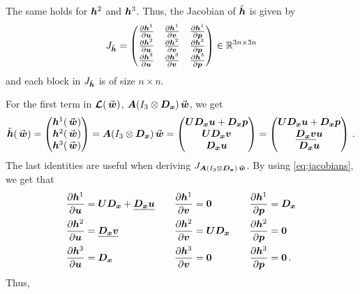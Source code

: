 The same holds for $\bm{h}^2$ and $\bm{h}^3$. Thus, the Jacobian of $\tilde{\bm{h}}$ is given by
\[
  J_{\tilde{\bm{h}}} =
  \begin{pmatrix}
    \frac{\partial \bm{h}^1 }{\partial \bm{u}} &
    \frac{\partial \bm{h}^1 }{\partial \bm{v}} & 
    \frac{\partial \bm{h}^1 }{\partial \bm{p}}
    \\
    \frac{\partial \bm{h}^2 }{\partial \bm{u}} &
    \frac{\partial \bm{h}^2 }{\partial \bm{v}} & 
    \frac{\partial \bm{h}^2 }{\partial \bm{p}}
    \\
    \frac{\partial \bm{h}^3 }{\partial \bm{u}} &
    \frac{\partial \bm{h}^3 }{\partial \bm{v}} & 
    \frac{\partial \bm{h}^3 }{\partial \bm{p}}
  \end{pmatrix}
  \in \mathbb{R}^{3n\times 3n}
\]
and each block in $J_{\tilde{\bm{h}}}$ is of size $n\times n$. 

For the first term in $\euln(\wn)$, $\An (I_3 \otimes \Dx) \wn$, we get 
\[
  \tilde{\hn}(\wn) = 
  \begin{pmatrix}
    \hn^1(\wn) \\ \hn^2(\wn) \\ \hn^3(\wn) 
  \end{pmatrix}
  =
  \An (I_3 \otimes \Dx) \wn = 
  \begin{pmatrix}
    \Un \Dx \un  + \Dx \pn
    \\
    \Un \Dx \vn
    \\
    \Dx \un
  \end{pmatrix}
  =
  \begin{pmatrix}
    \Un \Dx \un  + \Dx \pn
    \\
    \diagn{\Dx \vn}\un 
    \\
    \Dx \un
  \end{pmatrix}
  \, .
\]
The last identities are useful when deriving $J_{\An (I_3 \otimes \Dx) \wn}$. By using \eqref{eq:jacobians}, we get that
\begin{align*}
  \frac{\partial\bm{h}^1}{\partial \bm{u}}  & = \bm{U} \bm{D_x} + \underline{\bm{D_x}\bm{u}}
  \quad
  & \frac{\partial\bm{h}^1}{\partial \bm{v}} & = \bm{0}
  \quad
  & \frac{\partial\bm{h}^1}{\partial \bm{p}} & = \bm{D_x}
  \\
  \frac{\partial\bm{h}^2}{\partial \bm{u}}  & = \underline{\bm{D_x}\bm{v}} 
  \quad
  &\frac{\partial\bm{h}^2}{\partial \bm{v}}  & = \bm{U} \bm{D_x}
  \quad
  &\frac{\partial\bm{h}^2}{\partial \bm{p}}  & = \bm{0}
  \\
  \frac{\partial\bm{h}^3}{\partial \bm{u}}  & = \bm{D_x}
  \quad
  &\frac{\partial\bm{h}^3}{\partial \bm{v}}  & = \bm{0}
  \quad
  &\frac{\partial\bm{h}^3}{\partial \bm{p}}  & = \bm{0}
  \, .
\end{align*}
Thus,
